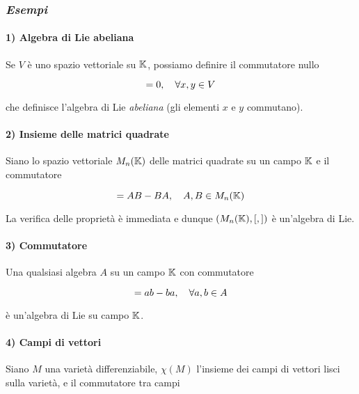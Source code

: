 \subsubsection{\textit{Esempi}}

\paragraph{1) Algebra di Lie abeliana}

Se $ V $ è uno spazio vettoriale su $ \mathbb{K} $, possiamo definire il commutatore nullo

\begin{equation}
	[x,y] = 0 \qcomma \forall x,y \in V
\end{equation}

che definisce l'algebra di Lie \textit{abeliana} (gli elementi $ x $ e $ y $ commutano).

\paragraph{2) Insieme delle matrici quadrate}

Siano lo spazio vettoriale $ M_{n}(\mathbb{K}) $ delle matrici quadrate su un campo $ \mathbb{K} $ e il commutatore

\begin{equation}
	[A,B] = AB - BA \qcomma A,B \in M_{n}(\K)
\end{equation}

La verifica delle proprietà è immediata e dunque $ (M_{n}(\mathbb{K}),[,]) $ è un'algebra di Lie.

\paragraph{3) Commutatore}

Una qualsiasi algebra $ A $ su un campo $ \mathbb{K} $ con commutatore

\begin{equation}
	[a,b] = ab - ba \qcomma \forall a,b \in A
\end{equation}

è un'algebra di Lie su campo $ \mathbb{K} $.

\paragraph{4) Campi di vettori}

Siano $ M $ una varietà differenziabile, $ \chi(M) $ l'insieme dei campi di vettori lisci sulla varietà, e il commutatore tra campi

